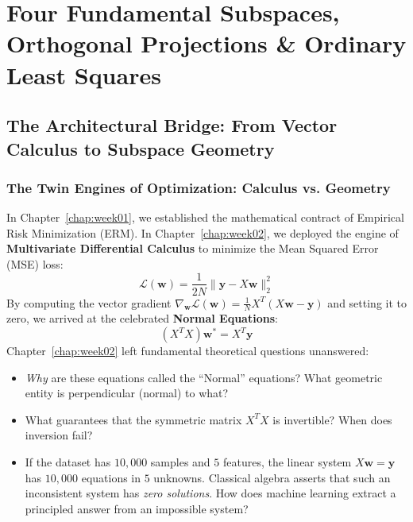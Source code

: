 \chapter[Subspaces, Projections \& Least Squares]{Four Fundamental Subspaces, Orthogonal Projections \& Ordinary Least Squares}
\label{chap:week03}

\section{The Architectural Bridge: From Vector Calculus to Subspace Geometry}

\subsection{The Twin Engines of Optimization: Calculus vs. Geometry}
In Chapter~\ref{chap:week01}, we established the mathematical contract of Empirical Risk Minimization (ERM). In Chapter~\ref{chap:week02}, we deployed the engine of \textbf{Multivariate Differential Calculus} to minimize the Mean Squared Error (MSE) loss:
\begin{equation}
\mathcal{L}(\mathbf{w}) = \frac{1}{2N} \|\mathbf{y} - X\mathbf{w}\|_2^2
\end{equation}
By computing the vector gradient $\nabla_{\mathbf{w}} \mathcal{L}(\mathbf{w}) = \frac{1}{N}X^T(X\mathbf{w} - \mathbf{y})$ and setting it to zero, we arrived at the celebrated \textbf{Normal Equations}:
\begin{equation}
(X^T X)\mathbf{w}^* = X^T \mathbf{y}
\label{eq:w03_normal_eq_bridge}
\end{equation}
Chapter~\ref{chap:week02} left fundamental theoretical questions unanswered:
\begin{itemize}
    \item \emph{Why} are these equations called the ``Normal'' equations? What geometric entity is perpendicular (normal) to what?
    \item What guarantees that the symmetric matrix $X^T X$ is invertible? When does inversion fail?
    \item If the dataset has $10{,}000$ samples and $5$ features, the linear system $X\mathbf{w} = \mathbf{y}$ has $10{,}000$ equations in $5$ unknowns. Classical algebra asserts that such an inconsistent system has \emph{zero solutions}. How does machine learning extract a principled answer from an impossible system?
\end{itemize}

